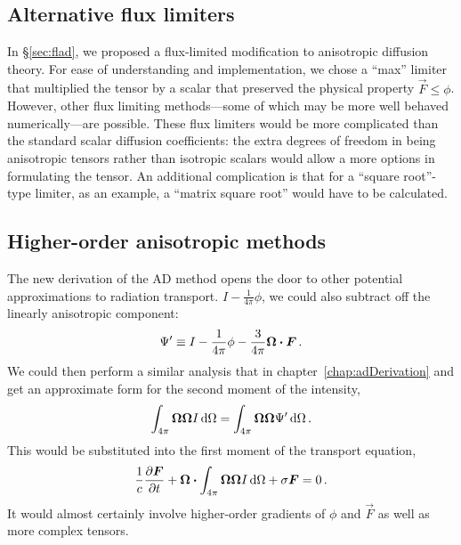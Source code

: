 \subsection{Alternative flux limiters}

In \S\ref{sec:flad}, we proposed a flux-limited modification to anisotropic
diffusion theory. For ease of understanding and implementation, we chose a
``max'' limiter that multiplied the tensor by a scalar that preserved the
physical property $\vec{F} \le \phi$. However, other flux limiting
methods---some of which may be more well behaved numerically---are possible.
These flux limiters would be more complicated than the standard scalar diffusion
coefficients: the extra degrees of freedom in being anisotropic tensors rather
than isotropic scalars would allow a more options in formulating the tensor.
An additional complication is that for a ``square root''-type limiter, as an
example, a ``matrix square root'' would have to be calculated.

\subsection{Higher-order anisotropic \texorpdfstring{\PN}{PN} methods}
The new derivation of the AD method opens the door to other potential
approximations to radiation transport.  $I -
\frac{1}{4\pi}\phi$, we could also subtract off the linearly anisotropic
component:
\begin{equation*}
  \Psi' \equiv I - \frac{1}{4\pi}\phi - \frac{3}{4\pi} \bm{\Omega} \bm{\cdot}
  \bm{F}\,.
\end{equation*}
We could then perform a similar analysis that in chapter~\ref{chap:adDerivation}
and get an approximate form for the second moment of the intensity,
\begin{equation*}
  \int_{4\pi} \bm{\Omega}\bm{\Omega} I \mathop{}\!\mathrm{d} \Omega
  = \int_{4\pi} \bm{\Omega}\bm{\Omega} \Psi' \mathop{}\!\mathrm{d} \Omega \,.
\end{equation*}
This would be substituted into the first moment of the transport equation,
\begin{equation*}
  \frac{1}{c}\frac{\partial \bm{F}}{\partial t}
  + \bm{\Omega} \bm{\cdot} \int_{4\pi} \bm{\Omega}\bm{\Omega} I \mathop{}\!\mathrm{d} \Omega
  + \sigma \bm{F}
  = 0 \,.
\end{equation*}
It would almost certainly involve higher-order gradients of $\phi$ and $\vec{F}$
as well as more complex tensors.

